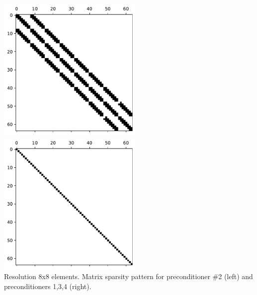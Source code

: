 \begin{center} 
\includegraphics[width=7cm]{python_codes/fieldstone_16/results/matrix_ps2}
\includegraphics[width=7cm]{python_codes/fieldstone_16/results/matrix_ps3}\\
{\captionfont Resolution 8x8 elements. Matrix sparsity pattern 
for preconditioner \#2 (left) and preconditioners 1,3,4 (right).}
\end{center}


